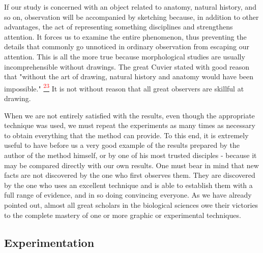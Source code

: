 \documentclass{article}
\newcommand{\noteref}[1]{%
 \hypertarget{ref:#1}{}%
 \hyperlink{note:#1}{\textsuperscript{\textcolor{red}{#1}}}%
}
\begin{document}
If our study is concerned with an object related to anatomy, natural history, and so on, observation will be accompanied by sketching because, in addition to other advantages, the act of representing something disciplines and strengthens attention. It forces us to examine the entire phenomenon, thus preventing the details that commonly go unnoticed in ordinary observation from escaping our attention. This is all the more true because morphological studies are usually incomprehensible without drawings. The great Cuvier stated with good reason that "without the art of drawing, natural history and anatomy would have been impossible."\noteref{23} It is not without reason that all great observers are skillful at drawing.

When we are not entirely satisfied with the results, even though the appropriate technique was used, we must repeat the experiments as many times as necessary to obtain everything that the method can provide. To this end, it is extremely useful to have before us a very good example of the results prepared by the author of the method himself, or by one of his most trusted disciples - because it may be compared directly with our own results. One must bear in mind that new facts are not discovered by the one who first observes them. They are discovered by the one who uses an excellent technique and is able to establish them with a full range of evidence, and in so doing convincing everyone. As we have already pointed out, almost all great scholars in the biological sciences owe their victories to the complete mastery of one or more graphic or experimental techniques.

\subsection*{Experimentation}
\end{document}
